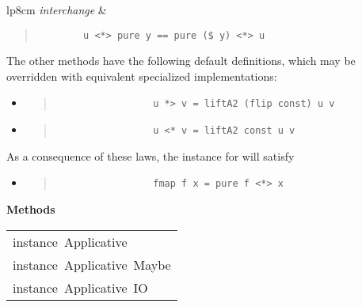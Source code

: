 \begin{haddockdesc}
\begin{tabular}{lp{8cm}}
\emph{interchange}
      & \begin{quote}
        {\haddockverb\begin{verbatim}
        u <*> pure y == pure ($ y) <*> u\end{verbatim}}
        \end{quote}
\end{tabular}

The other methods have the following default definitions, which may
 be overridden with equivalent specialized implementations:\par
                 \begin{itemize}
                 \item
                 \begin{quote}
                 {\haddockverb\begin{verbatim}
                 u *> v = liftA2 (flip const) u v\end{verbatim}}
                 \end{quote}
                 
                 \item
                 \begin{quote}
                 {\haddockverb\begin{verbatim}
                 u <* v = liftA2 const u v\end{verbatim}}
                 \end{quote}
                 
                 \end{itemize}
                 As a consequence of these laws, the  instance for  will satisfy\par
                 \begin{itemize}
                 \item
                 \begin{quote}
                 {\haddockverb\begin{verbatim}
                 fmap f x = pure f <*> x\end{verbatim}}
                 \end{quote}
                 
                 \end{itemize}
                 
\haddockpremethods{}\textbf{Methods}
\end{haddockdesc}
\begin{haddockdesc}
\item[\begin{tabular}{@{}l}
instance\ Applicative\ {\char 91}{\char 93}\\instance\ Applicative\ Maybe\\instance\ Applicative\ IO
\end{tabular}]
\end{haddockdesc}


